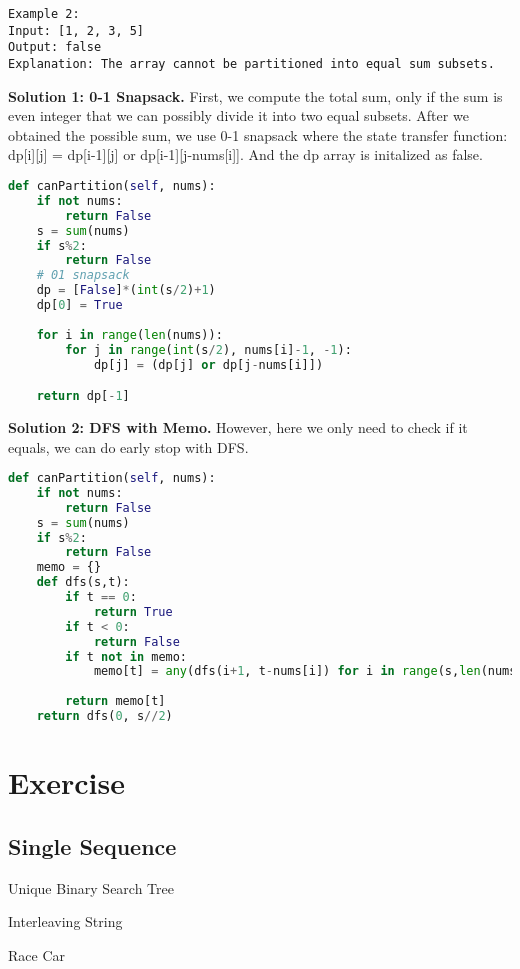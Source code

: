 \documentclass[../main.tex]{subfiles}
\begin{document}
\begin{examples}[resume]
\begin{lstlisting}[numbers=none]
Example 2:
Input: [1, 2, 3, 5]
Output: false
Explanation: The array cannot be partitioned into equal sum subsets.
\end{lstlisting}
\textbf{Solution 1: 0-1 Snapsack.} First, we compute the total sum, only if the sum is even integer that we can possibly divide it into two equal subsets. After we obtained the possible sum, we use 0-1 snapsack where the state transfer function: dp[i][j] = dp[i-1][j] or dp[i-1][j-nums[i]]. And the dp array is initalized as false. 
\begin{lstlisting}[language=Python]
def canPartition(self, nums):
    if not nums:
        return False
    s = sum(nums)
    if s%2:
        return False
    # 01 snapsack 
    dp = [False]*(int(s/2)+1)
    dp[0] = True
    
    for i in range(len(nums)):
        for j in range(int(s/2), nums[i]-1, -1):
            dp[j] = (dp[j] or dp[j-nums[i]]) 

    return dp[-1]
\end{lstlisting}
\textbf{Solution 2: DFS with Memo.} However, here we only need to check if it equals, we can do early stop with DFS. 
\begin{lstlisting}[language=Python]
def canPartition(self, nums):
    if not nums:
        return False
    s = sum(nums)
    if s%2:
        return False
    memo = {}
    def dfs(s,t):
        if t == 0:
            return True
        if t < 0:
            return False
        if t not in memo:               
            memo[t] = any(dfs(i+1, t-nums[i]) for i in range(s,len(nums)))
       
        return memo[t]
    return dfs(0, s//2)
\end{lstlisting}
\end{examples}

\section{Exercise}
\subsection{Single Sequence}
Unique Binary Search Tree

Interleaving String

Race Car
\end{document}
